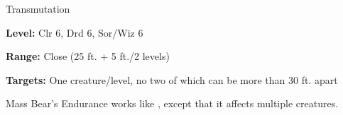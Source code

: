 \label{spell:Mass Bear's Endurance}

Transmutation

\textbf{Level:} Clr 6, Drd 6, Sor/Wiz 6

\textbf{Range:} Close (25 ft. + 5 ft./2 levels)

\textbf{Targets:} One creature/level, no two of which can be more than 30 ft. apart

Mass Bear's Endurance works like , except that 
it affects multiple creatures.

